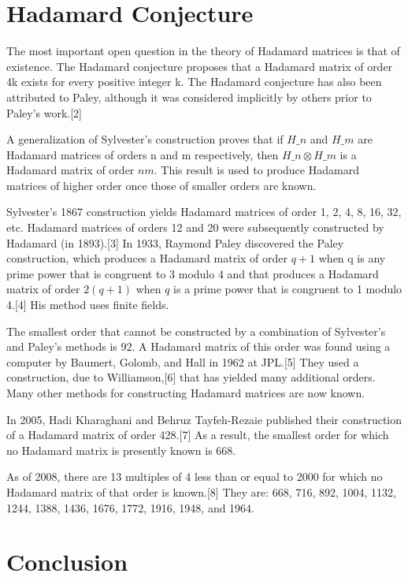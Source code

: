 \documentclass{article}
\theoremstyle{definition}
\begin{document}
\section{Hadamard Conjecture}
The most important open question in the theory of Hadamard matrices is that of existence. The Hadamard conjecture proposes that a Hadamard matrix of order 4k exists for every positive integer k. The Hadamard conjecture has also been attributed to Paley, although it was considered implicitly by others prior to Paley's work.[2]

A generalization of Sylvester's construction proves that if $H\_n$ and $H\_m$ are Hadamard matrices of orders n and m respectively, then $H\_n \otimes H\_m$ is a Hadamard matrix of order $nm$. This result is used to produce Hadamard matrices of higher order once those of smaller orders are known.

Sylvester's 1867 construction yields Hadamard matrices of order 1, 2, 4, 8, 16, 32, etc. Hadamard matrices of orders 12 and 20 were subsequently constructed by Hadamard (in 1893).[3] In 1933, Raymond Paley discovered the Paley construction, which produces a Hadamard matrix of order $q+1$ when q is any prime power that is congruent to 3 modulo 4 and that produces a Hadamard matrix of order $2(q+1)$ when $q$ is a prime power that is congruent to 1 modulo 4.[4] His method uses finite fields.

The smallest order that cannot be constructed by a combination of Sylvester's and Paley's methods is 92. A Hadamard matrix of this order was found using a computer by Baumert, Golomb, and Hall in 1962 at JPL.[5] They used a construction, due to Williamson,[6] that has yielded many additional orders. Many other methods for constructing Hadamard matrices are now known.

In 2005, Hadi Kharaghani and Behruz Tayfeh-Rezaie published their construction of a Hadamard matrix of order 428.[7] As a result, the smallest order for which no Hadamard matrix is presently known is 668.

As of 2008, there are 13 multiples of 4 less than or equal to 2000 for which no Hadamard matrix of that order is known.[8] They are: 668, 716, 892, 1004, 1132, 1244, 1388, 1436, 1676, 1772, 1916, 1948, and 1964.


\section{Conclusion}
\end{document}
